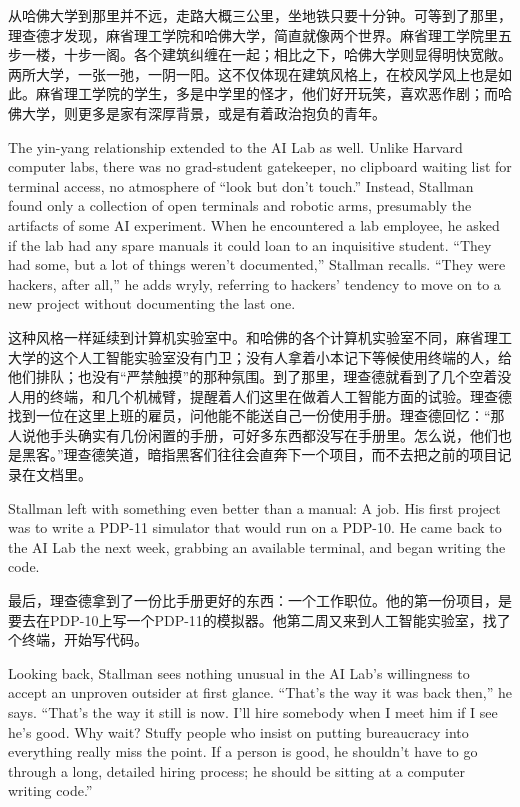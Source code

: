 \ifdefined\chs
从哈佛大学到那里并不远，走路大概三公里，坐地铁只要十分钟。可等到了那里，理查德才发现，麻省理工学院和哈佛大学，简直就像两个世界。麻省理工学院里五步一楼，十步一阁。各个建筑纠缠在一起；相比之下，哈佛大学则显得明快宽敞。两所大学，一张一弛，一阴一阳。这不仅体现在建筑风格上，在校风学风上也是如此。麻省理工学院的学生，多是中学里的怪才，他们好开玩笑，喜欢恶作剧；而哈佛大学，则更多是家有深厚背景，或是有着政治抱负的青年。
\fi

\ifdefined\eng
The yin-yang relationship extended to the AI Lab as well. Unlike Harvard computer labs, there was no grad-student gatekeeper, no clipboard waiting list for terminal access, no atmosphere of ``look but don't touch.'' Instead, Stallman found only a collection of open terminals and robotic arms, presumably the artifacts of some AI experiment. When he encountered a lab employee, he asked if the lab had any spare manuals it could loan to an inquisitive student. ``They had some, but a lot of things weren't documented,'' Stallman recalls. ``They were hackers, after all,'' he adds wryly, referring to hackers' tendency to move on to a new project without documenting the last one.
\fi

\ifdefined\chs
这种风格一样延续到计算机实验室中。和哈佛的各个计算机实验室不同，麻省理工大学的这个人工智能实验室没有门卫；没有人拿着小本记下等候使用终端的人，给他们排队；也没有“严禁触摸”的那种氛围。到了那里，理查德就看到了几个空着没人用的终端，和几个机械臂，提醒着人们这里在做着人工智能方面的试验。理查德找到一位在这里上班的雇员，问他能不能送自己一份使用手册。理查德回忆：“那人说他手头确实有几份闲置的手册，可好多东西都没写在手册里。怎么说，他们也是黑客。”理查德笑道，暗指黑客们往往会直奔下一个项目，而不去把之前的项目记录在文档里。
\fi

\ifdefined\eng
Stallman left with something even better than a manual: A job.  His first project was to write a PDP-11 simulator that would run on a PDP-10. He came back to the AI Lab the next week, grabbing an available terminal, and began writing the code.
\fi

\ifdefined\chs
最后，理查德拿到了一份比手册更好的东西：一个工作职位。他的第一份项目，是要去在PDP-10上写一个PDP-11的模拟器。他第二周又来到人工智能实验室，找了个终端，开始写代码。
\fi

\ifdefined\eng
Looking back, Stallman sees nothing unusual in the AI Lab's willingness to accept an unproven outsider at first glance. ``That's the way it was back then,'' he says. ``That's the way it still is now. I'll hire somebody when I meet him if I see he's good. Why wait? Stuffy people who insist on putting bureaucracy into everything really miss the point. If a person is good, he shouldn't have to go through a long, detailed hiring process; he should be sitting at a computer writing code.''
\fi

